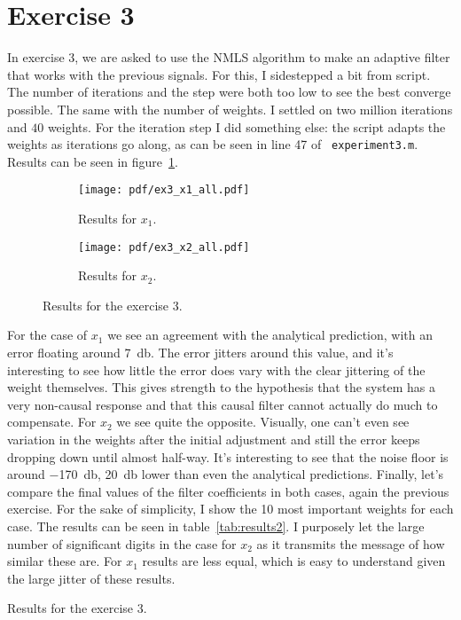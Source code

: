 \section{Exercise 3}

In exercise 3, we are asked to use the NMLS algorithm to make an adaptive filter
that works with the previous signals. For this, I sidestepped a bit from script.
The number of iterations and the step were both too low to see the best converge
possible. The same with the number of weights. I settled on two million iterations
and \(40\) weights. For the iteration step I did something else: the script adapts
the weights as iterations go along, as can be seen in line 47 of {\tt
        experiment3.m}. Results can be seen in figure~\ref{fig:ex3res}.
\begin{figure}
    \centering
    \begin{subfigure}[t]{0.32\columnwidth}
        \centering
        \texttt{[image: pdf/ex3\_x1\_all.pdf]}
        \caption{Results for \(x_1\).}
    \end{subfigure} \hspace{1cm}
    \begin{subfigure}[t]{0.32\columnwidth}
        \centering
        \texttt{[image: pdf/ex3\_x2\_all.pdf]}
        \caption{Results for \(x_2\).}
    \end{subfigure}
    \caption{Results for the exercise 3.\label{fig:ex3res}}
\end{figure}
For the case of \(x_1\) we see an agreement with the analytical prediction, with
an error floating around \SI{7}{\decibel}. The error jitters around this value,
and it's interesting to see how little the error does vary with the clear
jittering of the weight themselves. This gives strength to the hypothesis that the
system has a very non-causal response and that this causal filter cannot actually
do much to compensate. For \(x_2\) we see quite the opposite. Visually, one can't
even see variation in the weights after the initial adjustment and still the error
keeps dropping down until almost half-way. It's interesting to see that the noise
floor is around \SI{-170}{\decibel}, \SI{20}{\decibel} lower than even the
analytical predictions. Finally, let's compare the final values of the filter
coefficients in both cases, again the previous exercise. For the sake of
simplicity, I show the 10 most important weights for each case. The results can be
seen in table~\ref{tab:results2}. I purposely let the large number of significant
digits in the case for \(x_2\) as it transmits the message of how similar these
are. For \(x_1\) results are less equal, which is easy to understand given the
large jitter of these results.
\begin{table}
    \centering
    
    \caption{Results for the exercise 3.\label{tab:results2}}
\end{table}

